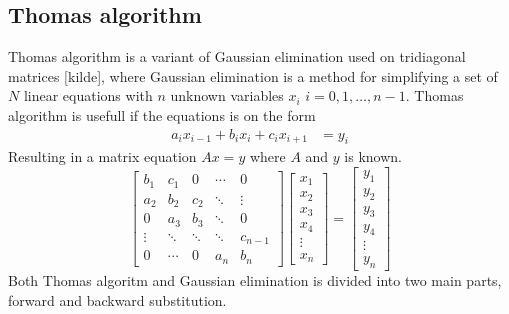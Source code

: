 \documentclass[twoside,twocolumn]{article}
\begin{document}
\subsection{Thomas algorithm}
Thomas algorithm is a variant of Gaussian elimination used on tridiagonal matrices [kilde], where Gaussian elimination is a method for simplifying a set of $N$ linear equations with $n$ unknown variables $x_i$ $i=0,1,\ldots,n-1$. Thomas algorithm is usefull if the equations is on the form 
\begin{align*}
a_{i}x_{i-1}+b_{i}x_i+c_{i}x_{i+1}&=y_i
\end{align*}
Resulting in a matrix equation $Ax= y$ where $A$ and $y$ is known.
\begin{equation*}
\begin{bmatrix}
b_1&c_1&0&\cdots &0\\
a_2&b_2&c_2& \ddots & \vdots\\
0&a_3&b_3&\ddots&0\\
\vdots&\ddots&\ddots&\ddots&c_{n-1}\\
0&\cdots&0&a_n&b_n
\end{bmatrix}
\begin{bmatrix}
x_1\\x_2\\x_3\\x_4\\\vdots\\x_{n}
\end{bmatrix}=
\begin{bmatrix}
y_1\\y_2\\y_3\\y_4\\\vdots\\y_{n}
\end{bmatrix} 
\end{equation*}
Both Thomas algoritm and Gaussian elimination is divided into two main parts, forward and backward substitution.
\end{document}

